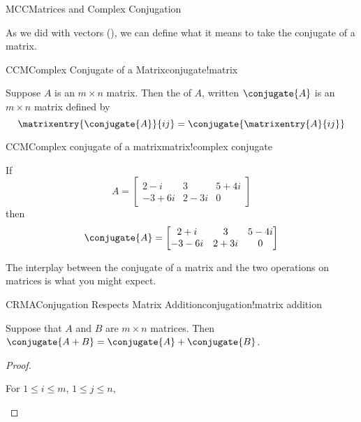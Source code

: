 \begin{subsect}{MCC}{Matrices and Complex Conjugation}
%
\begin{para}As we did with vectors (), we can define what it means to take the conjugate of a matrix.\end{para}
%
\begin{definition}{CCM}{Complex Conjugate of a Matrix}{conjugate!matrix}
\begin{para}Suppose $A$ is an $m\times n$ matrix.  Then the  of $A$, written $\conjugate{A}$ is an $m\times n$ matrix defined by
%
\begin{equation*}
\matrixentry{\conjugate{A}}{ij}=\conjugate{\matrixentry{A}{ij}}
\end{equation*}\end{para}
%
\end{definition}
%
\begin{example}{CCM}{Complex conjugate of a matrix}{matrix!complex conjugate}
\begin{para}If
%
\begin{equation*}
A=
\begin{bmatrix}
2-i & 3 & 5+4i\\
-3+6i & 2-3i & 0
\end{bmatrix}
\end{equation*}
%
then
%
\begin{equation*}
\conjugate{A}=
\begin{bmatrix}
2+i & 3 & 5-4i\\
-3-6i & 2+3i & 0
\end{bmatrix}
\end{equation*}\end{para}
%
\end{example}
%
\begin{para}The interplay between the conjugate of a matrix and the two operations on matrices is what you might expect.\end{para}
%
\begin{theorem}{CRMA}{Conjugation Respects Matrix Addition}{conjugation!matrix addition}
\begin{para}Suppose that $A$ and $B$ are $m\times n$ matrices.  Then $\conjugate{A+B}=\conjugate{A}+\conjugate{B}$.\end{para}
\end{theorem}
%
\begin{proof}
%
\begin{para}For $1\leq i\leq m$, $1\leq j\leq n$,

\end{para}
\end{proof}
\end{subsect}
